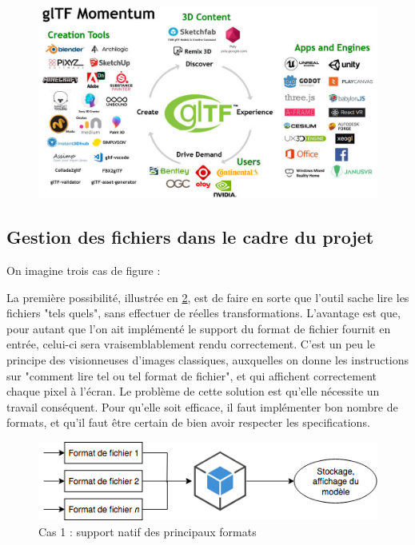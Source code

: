 \begin{figure}
    \centering
    \includegraphics[width=0.8\linewidth]{Figures/gltf-momentum.jpg}
    \label{fig:gltf-momentum}
\end{figure}

\subsection{Gestion des fichiers dans le cadre du projet}

On imagine trois cas de figure :

La première possibilité, illustrée en \ref{fig:file-importation-process-native}, est de faire en sorte que l'outil sache lire les fichiers "tels quels", sans effectuer de réelles transformations.
L'avantage est que, pour autant que l'on ait implémenté le support du format de fichier fournit en entrée, celui-ci sera vraisemblablement rendu correctement. C'est un peu le principe des visionneuses d'images classiques, auxquelles on donne les instructions sur "comment lire tel ou tel format de fichier", et qui affichent correctement chaque pixel à l'écran.
Le problème de cette solution est qu'elle nécessite un travail conséquent. Pour qu'elle soit efficace, il faut implémenter bon nombre de formats, et qu'il faut être certain de bien avoir respecter les specifications.

\begin{figure}[ht]
    \centering
    \includegraphics[width=\linewidth]{Figures/file-importation-process-native.png}
    \caption{Cas 1 : support natif des principaux formats}
    \label{fig:file-importation-process-native}
\end{figure}

